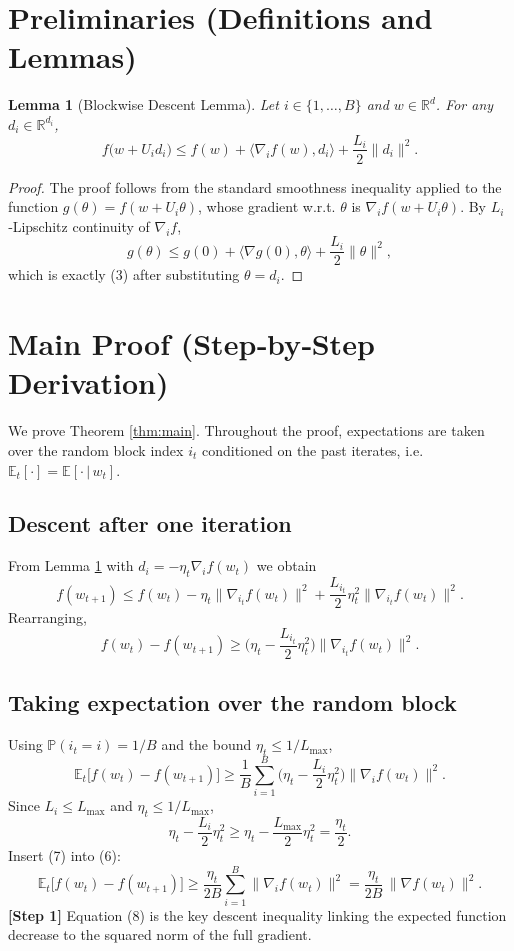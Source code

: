 \documentclass{article}
\newtheorem{lemma}{Lemma}
\begin{document}
\newpage

\section*{Preliminaries (Definitions and Lemmas)}
\begin{lemma}[Blockwise Descent Lemma]\label{lem:descent}
Let $i\in\{1,\dots ,B\}$ and $w\in\mathbb{R}^{d}$.  For any $d_i\in\mathbb{R}^{d_i}$,
\[
f\big(w+U_i d_i\big)
\le
f(w)+\langle \nabla_i f(w),d_i\rangle
+\frac{L_i}{2}\|d_i\|^{2}.
\tag{3}
\]
\end{lemma}
\begin{proof}
The proof follows from the standard smoothness inequality applied to the
function $g(\theta)=f(w+U_i\theta)$, whose gradient w.r.t. $\theta$ is
$\nabla_i f(w+U_i\theta)$.  By $L_i$‑Lipschitz continuity of $\nabla_i f$,
\[
g(\theta)\le g(0)+\langle \nabla g(0),\theta\rangle+\frac{L_i}{2}\|\theta\|^{2},
\]
which is exactly (3) after substituting $\theta=d_i$.
\end{proof}

\section*{Main Proof (Step‑by‑Step Derivation)}
We prove Theorem \ref{thm:main}.  Throughout the proof,
expectations are taken over the random block index $i_t$ conditioned on the
past iterates, i.e. $\mathbb{E}_t[\cdot]=\mathbb{E}[\cdot\,|\,w_t]$.

\subsection*{Descent after one iteration}
From Lemma \ref{lem:descent} with $d_i=-\eta_t\nabla_i f(w_t)$ we obtain
\[
f(w_{t+1})
\le f(w_t)-\eta_t\|\nabla_{i_t}f(w_t)\|^{2}
+\frac{L_{i_t}}{2}\eta_t^{2}\|\nabla_{i_t}f(w_t)\|^{2}.
\tag{4}
\]
Rearranging,
\[
f(w_t)-f(w_{t+1})
\ge \Big(\eta_t-\frac{L_{i_t}}{2}\eta_t^{2}\Big)\|\nabla_{i_t}f(w_t)\|^{2}.
\tag{5}
\]

\subsection*{Taking expectation over the random block}
Using $\mathbb{P}(i_t=i)=1/B$ and the bound $\eta_t\le 1/L_{\max}$,
\[
\mathbb{E}_t\!\big[f(w_t)-f(w_{t+1})\big]
\ge
\frac{1}{B}\sum_{i=1}^{B}
\Big(\eta_t-\frac{L_i}{2}\eta_t^{2}\Big)\|\nabla_i f(w_t)\|^{2}.
\tag{6}
\]
Since $L_i\le L_{\max}$ and $\eta_t\le 1/L_{\max}$,
\[
\eta_t-\frac{L_i}{2}\eta_t^{2}
\ge
\eta_t-\frac{L_{\max}}{2}\eta_t^{2}
= \frac{\eta_t}{2}.
\tag{7}
\]
Insert (7) into (6):
\[
\mathbb{E}_t\!\big[f(w_t)-f(w_{t+1})\big]
\ge
\frac{\eta_t}{2B}\sum_{i=1}^{B}\|\nabla_i f(w_t)\|^{2}
= \frac{\eta_t}{2B}\,\|\nabla f(w_t)\|^{2}.
\tag{8}
\]
\textbf{[Step 1]} Equation (8) is the key descent inequality linking the
expected function decrease to the squared norm of the full gradient.
\end{document}
